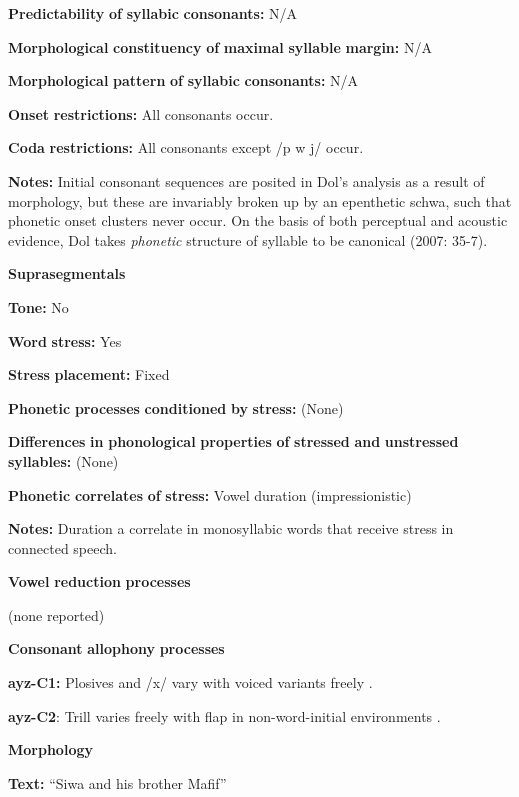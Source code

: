 \textbf{Predictability} \textbf{of} \textbf{syllabic} \textbf{consonants:} N/A

\textbf{Morphological} \textbf{constituency} \textbf{of} \textbf{maximal} \textbf{syllable} \textbf{margin:} N/A

\textbf{Morphological} \textbf{pattern} \textbf{of} \textbf{syllabic} \textbf{consonants:} N/A

\textbf{Onset} \textbf{restrictions:} All consonants occur.

\textbf{Coda} \textbf{restrictions:} All consonants except /p w j/ occur.

\textbf{Notes:} Initial consonant sequences are posited in Dol’s analysis as a result of morphology, but these are invariably broken up by an epenthetic schwa, such that phonetic onset clusters never occur. On the basis of both perceptual and acoustic evidence, Dol takes \textit{phonetic} structure of syllable to be canonical (2007: 35-7).

\textbf{Suprasegmentals}

\textbf{Tone:} No

\textbf{Word} \textbf{stress:} Yes

\textbf{Stress} \textbf{placement:} Fixed

\textbf{Phonetic} \textbf{processes} \textbf{conditioned} \textbf{by} \textbf{stress:} (None)

\textbf{Differences} \textbf{in} \textbf{phonological} \textbf{properties} \textbf{of} \textbf{stressed} \textbf{and} \textbf{unstressed} \textbf{syllables:} (None)

\textbf{Phonetic} \textbf{correlates} \textbf{of} \textbf{stress:} Vowel duration (impressionistic)

\textbf{Notes:} Duration a correlate in monosyllabic words that receive stress in connected speech.

\textbf{Vowel} \textbf{reduction} \textbf{processes}

(none reported)

\textbf{Consonant} \textbf{allophony} \textbf{processes}

\textbf{ayz-C1:} Plosives and /x/ vary with voiced variants freely \citep[21-2]{Dol2007}.

\textbf{ayz-C2}: Trill varies freely with flap in non-word-initial environments \citep[24]{Dol2007}.

\textbf{Morphology}

\textbf{Text:} “Siwa and his brother Mafif” \citep[284-291]{Dol2007}


